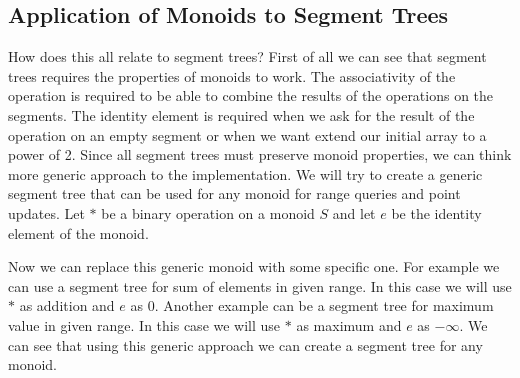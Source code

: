 \documentclass{article}
\begin{document}
\subsection{Application of Monoids to Segment Trees}
How does this all relate to segment trees?
First of all we can see that segment trees requires the properties of monoids to work.
The associativity of the operation is required to be able to combine the results of the operations on the segments.
The identity element is required when we ask for the result of the operation on an empty segment or 
when we want extend our initial array to a power of 2. 
Since all segment trees must preserve monoid properties, we can think more generic 
approach to the implementation. We will try to create a generic segment tree that can be used for any monoid for 
range queries and point updates. Let \(\ast\) be a binary operation on a monoid \(S\) and let \(e\) be the identity element of the monoid.


\FloatBarrier
Now we can replace this generic monoid with some specific one.
For example we can use a segment tree for sum of elements in given range.
In this case we will use \(\ast\) as addition and \(e\) as 0. 
Another example can be a segment tree for maximum value in given range.
In this case we will use \(\ast\) as maximum and \(e\) as \(-\infty\).
We can see that using this generic approach we can create a segment tree for any monoid.
\end{document}
